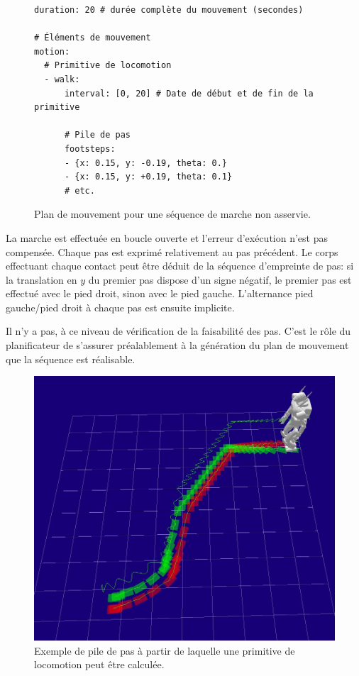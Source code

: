 \begin{figure}
  \begin{center}
\begin{verbatim}
duration: 20 # durée complète du mouvement (secondes)

# Éléments de mouvement
motion:
  # Primitive de locomotion
  - walk:
      interval: [0, 20] # Date de début et de fin de la primitive

      # Pile de pas
      footsteps:
      - {x: 0.15, y: -0.19, theta: 0.}
      - {x: 0.15, y: +0.19, theta: 0.1}
      # etc.
\end{verbatim}
  \end{center}
  \caption{Plan de mouvement pour une séquence de marche non asservie.\label{fig:plan_locomotion_simple}}
\end{figure}

La marche est effectuée en boucle ouverte et l'erreur d'exécution
n'est pas compensée. Chaque pas est exprimé relativement au pas
précédent. Le corps effectuant chaque contact peut être déduit de la
séquence d'empreinte de pas: si la translation en $y$ du premier pas
dispose d'un signe négatif, le premier pas est effectué avec le pied
droit, sinon avec le pied gauche. L'alternance pied gauche/pied droit
à chaque pas est ensuite implicite.


Il n'y a pas, à ce niveau de vérification de la faisabilité des
pas. C'est le rôle du planificateur de s'assurer préalablement à la
génération du plan de mouvement que la séquence est réalisable.

\begin{figure}
  \begin{center}
    \includegraphics[width=.95\linewidth]{src/chap3-primitive-mouvement/footsteps1.jpg}
  \end{center}
  \caption{Exemple de pile de pas à partir de laquelle une primitive
    de locomotion peut être calculée.}
\end{figure}


